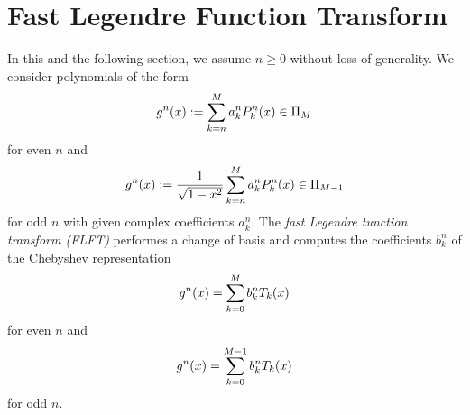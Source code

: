 

\section{Fast Legendre Function Transform}
\label{DSFT:FLFT}

In this and the following section, we assume $n \ge 0$ without loss of generality. We consider polynomials of the form
\begin{equation}
  \label{NFSFT:GnEven}
 g^n{\hspace{-0.4ex}}\left(x\right) := \sum_{k=n}^M a_k^n P_k^n{\hspace{-0.4ex}}\left(x\right) \in \Pi_M
 \end{equation}
for even $n$ and
\begin{equation}
  \label{NFSFT:GnOdd}
  g^n{\hspace{-0.4ex}}\left(x\right) := \frac{1}{\sqrt{1-x^2}} \sum_{k=n}^M a_k^n P_k^n{\hspace{-0.4ex}}\left(x\right) \in \Pi_{M-1}
\end{equation}
for odd $n$ with given complex coefficients $a_k^n$.
The \emph{fast Legendre tunction transform (FLFT)} performes a change of basis and computes the 
coefficients $b_k^n$ of the Chebyshev representation
\[ g^n{\hspace{-0.4ex}}\left(x\right) = \sum_{k=0}^M b_k^n T_k{\hspace{-0.4ex}}\left(x\right)\]
for even $n$ and
\[g^n{\hspace{-0.4ex}}\left(x\right) = \sum_{k=0}^{M-1} b_k^n T_k{\hspace{-0.4ex}}\left(x\right)\]
for odd $n$.

